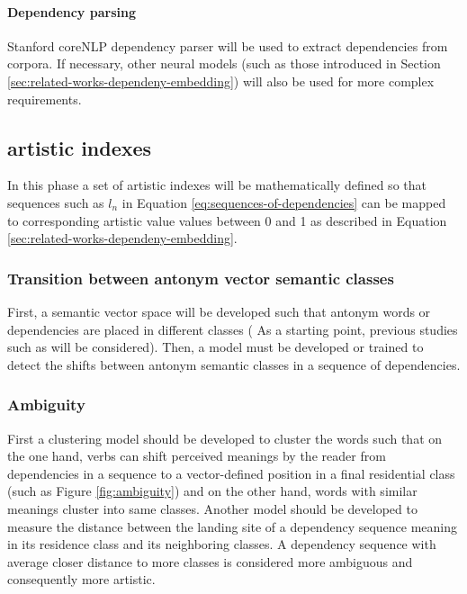 \documentclass{article}
\begin{document}
	\paragraph{Dependency parsing} Stanford coreNLP dependency parser will be used to extract dependencies from corpora. If necessary, other neural models (such as those introduced in Section \ref{sec:related-works-dependeny-embedding}) will also be used for more complex requirements. 
	\subsection{artistic indexes} \label{sec:methodology-artistic value-indexes}
	In this phase a set of artistic indexes will be mathematically defined so that sequences such as $l_n$ in Equation \ref{eq:sequences-of-dependencies} can be mapped to corresponding artistic value values between 0 and 1 as described in Equation \ref{sec:related-works-dependeny-embedding}.
	\subsubsection{Transition between antonym vector semantic classes}\label{sec:methodology-antonym-class-shifts}
	First, a semantic vector space will be developed such that antonym words or dependencies are placed in different classes ( As a starting point, previous studies such as \citet{ono-2015-word-embedding-based-antonym-detection-using-thesauri-and-distributional-information} will be considered). Then, a model must be developed or trained %
	to detect the shifts between antonym semantic classes in a sequence of dependencies.    
	
	\subsubsection{Ambiguity} \label{sec:methodology-ambiguity-appeal}
	First a clustering model should be developed to cluster the words such that on the one hand, verbs can shift perceived meanings by the reader from dependencies in a sequence to  a vector-defined position in a final residential class (such as Figure \ref{fig:ambiguity}) and on the other hand, words with similar meanings cluster into same classes. Another model should be developed to measure the distance between the landing site of a dependency sequence meaning in its residence class and its neighboring classes. A dependency sequence with average closer distance to more classes is considered more ambiguous and consequently more artistic.  
	
\end{document}
